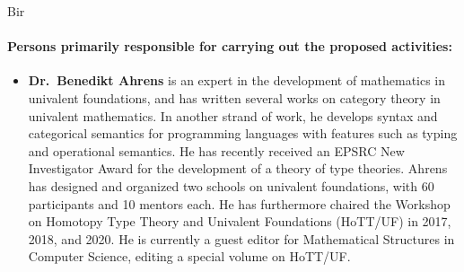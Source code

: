 \begin{sitedescription}{Bir}
\paragraph{Persons primarily responsible for carrying out the proposed activities:}

\begin{itemize}
 \item 
\textbf{Dr.\ Benedikt Ahrens} is an expert in the development of mathematics in univalent foundations, and has written several works on category theory in univalent mathematics.
In another strand of work, he develops syntax and categorical semantics for programming languages with features such as typing and operational semantics.
He has recently received an EPSRC New Investigator Award for the development of a theory of type theories.
Ahrens has designed and organized two schools on univalent foundations, with 60 participants and 10 mentors each. He has furthermore chaired the Workshop on Homotopy Type Theory and Univalent Foundations (HoTT/UF) in 2017, 2018, and 2020. He is currently a guest editor for Mathematical Structures in Computer Science, editing a special volume on HoTT/UF.
\end{itemize}






\end{sitedescription}

